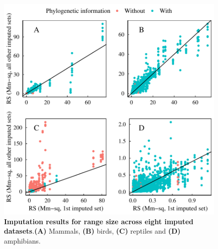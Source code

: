 \documentclass[11pt]{article}
\begin{document}
\begin{figure}[h!]
\centering
\includegraphics[scale=0.6]{figures/Congruence_continuous_traits/RS}
\caption[Imputation results for range size across eight imputed datasets]{\textbf{Imputation results for range size across eight imputed datasets}.\textbf{(A)} Mammals, \textbf{(B)} birds, \textbf{(C)} reptiles and \textbf{(D)} amphibians.}
\label{congruenceRS}
\end{figure}
\end{document}
